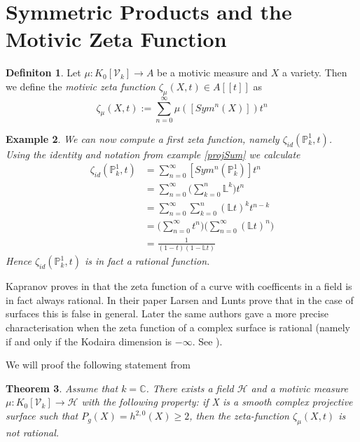 \documentclass[11pt, a4paper, german]{article}
\theoremstyle{plain}
\newtheorem{theorem}{Theorem}
\newtheorem{example}[theorem]{Example}
\theoremstyle{definition}
\newtheorem{definition}[theorem]{Definiton}
\newcommand{\gring}[1][k]{K_0[\mathcal{V}_#1]}
\begin{document}
\section{Symmetric Products and the Motivic Zeta Function}

\begin{definition}
    Let $\mu: \gring \to A$ be a motivic measure and $X$ a variety. Then we define the \emph{motivic zeta function} 
    $\zeta_{\mu}(X,t) \in A[[t]]$ as
    \[
        \zeta_{\mu}(X,t) := \sum_{n=0}^\infty \mu([Sym^n(X)])t^n
    \]
\end{definition}

\begin{example}
    We can now compute a first zeta function, namely $\zeta_{id}(\mathbb{P}_k^1, t)$. Using the identity and notation from example \ref{projSum}
    we calculate
    \begin{align*}
        \zeta_{id}(\mathbb{P}_k^1, t) & = \sum_{n=0}^\infty [Sym^n({\mathbb{P}_k^1})]t^n \\
                                      & = \sum_{n=0}^\infty \big(\sum_{k=0}^n \mathbb{L}^k\big) t^n \\
                                      & = \sum_{n=0}^\infty \sum_{k=0}^n (\mathbb{L}t)^k t^{n-k} \\
                                      & = \Big( \sum_{n=0}^\infty t^n \Big) \Big( \sum_{n=0}^\infty (\mathbb{L}t)^n \Big) \\
                                      & = \frac{1}{(1-t)(1-\mathbb{L}t)}
    \end{align*}
    Hence $\zeta_{id}(\mathbb{P}_k^1, t)$ is in fact a rational function.
\end{example}

Kapranov proves in \cite{kapranov} that the zeta function of a curve with coefficents in a field is in fact always rational. 
In their paper \cite{MR1996804} Larsen and Lunts prove that in the case of surfaces this is false in general.
Later the same authors gave a more precise characterisation when the zeta function of a complex surface is rational 
(namely if and only if the Kodaira dimension is $-\infty$. See \cite{LL2}).

We will proof the following statement from \cite{MR1996804}
\begin{theorem}
    Assume that $k = \mathbb{C}$. There exists a field $\mathcal{H}$ and a motivic measure $\mu: \gring \to \mathcal{H}$ with the following
    property: if X is a smooth complex projective surface such that $P_g(X)=h^{2,0}(X) \ge 2$, then the zeta-function $\zeta_{\mu}(X,t)$
    is not rational.
\end{theorem}
\end{document}
